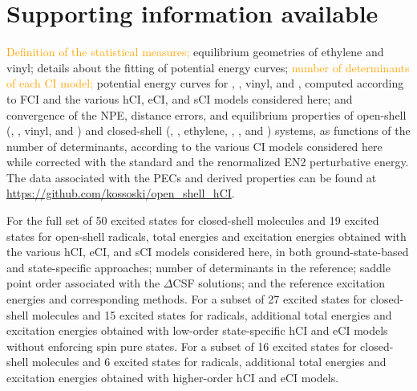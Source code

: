 \documentclass[aip,jcp,reprint,noshowkeys,superscriptaddress]{revtex4-1}
\newcommand{\fk}[1]{\textcolor{orange}{#1}}
\begin{document}
\section*{Supporting information available}
\label{sec:SI}

\fk{Definition of the statistical measures;}
equilibrium geometries of ethylene and vinyl; details about the fitting of potential energy curves;
\fk{number of determinants of each CI model;}
potential energy curves for , , vinyl, and ,
computed according to FCI and the various hCI, eCI, and sCI models considered here;
and convergence of the NPE, distance errors, and equilibrium properties of
open-shell (, , vinyl, and )
and closed-shell (, , ethylene, , , and ) systems,
as functions of the number of determinants, according to the various CI models considered here while
corrected with the standard and the renormalized EN2 perturbative energy.
The data associated with the PECs and derived properties can be found at \url{https://github.com/kossoski/open_shell_hCI}.

For the full set of 50 excited states for closed-shell molecules and 19 excited states for open-shell radicals,
total energies and excitation energies obtained with
the various hCI, eCI, and sCI models considered here, in both ground-state-based and state-specific approaches;
number of determinants in the reference; saddle point order associated with the $\Delta$CSF solutions;
and the reference excitation energies and corresponding methods.
For a subset of 27 excited states for closed-shell molecules and 15 excited states for radicals,
additional total energies and excitation energies obtained with low-order state-specific hCI and eCI models without enforcing spin pure states.
For a subset of 16 excited states for closed-shell molecules and 6 excited states for radicals,
additional total energies and excitation energies obtained with higher-order hCI and eCI models.

\end{document}
